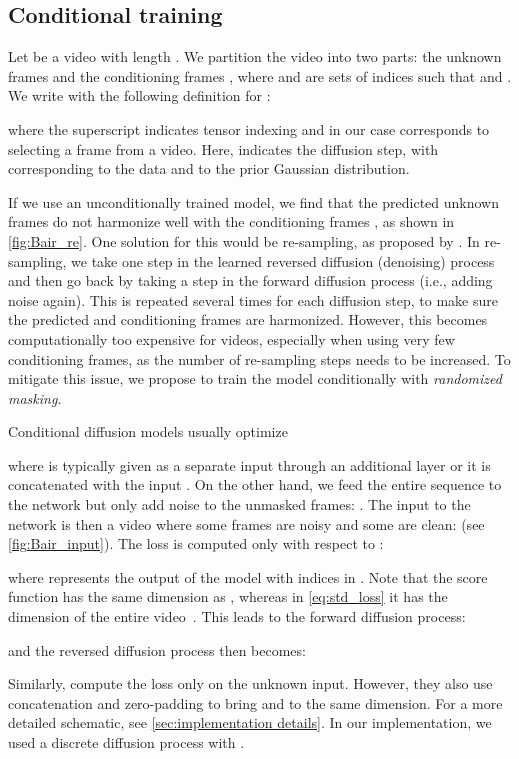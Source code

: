 \documentclass[10pt]{article} \usepackage[accepted]{tmlr}
\begin{document}
\subsection{Conditional training}
\label{sec:conditional_training}
Let  be a video with length . We partition the video  into two parts: the unknown frames  and the conditioning frames , where  and  are sets of indices such that  and . We write  with the following definition for :

where the superscript  indicates tensor indexing and in our case corresponds to selecting a frame from a video.
Here,  indicates the diffusion step, with  corresponding to the data and  to the prior Gaussian distribution.


If we use an unconditionally trained model, we find that the predicted unknown frames  do not harmonize well with the conditioning frames , as shown in \cref{fig:Bair_re}. One solution for this would be re-sampling, as proposed by \citet{Lugmayr_2022}. 
In re-sampling, we take one step in the learned reversed diffusion (denoising) process and then go back by taking a step in the forward diffusion process (i.e., adding noise again). This is repeated several times for each diffusion step, to make sure the predicted and conditioning frames are harmonized. However, this becomes computationally too expensive for videos, especially when using very few conditioning frames, as the number of re-sampling steps needs to be increased. To mitigate this issue, we propose to train the model conditionally with \emph{randomized masking}.

Conditional diffusion models usually optimize

where  is typically given as a separate input through an additional layer \citep{chen2021wavegrad} or it is concatenated with the input \citep{Saharia_2021, batzolis_2021, Saharia_2021_2}. On the other hand, we feed the entire sequence to the network  but only add noise to the unmasked frames: . The input to the network is then a video where some frames are noisy and some are clean:  (see \cref{fig:Bair_input}). The loss is computed only with respect to :

where  represents the output of the model with indices in . Note that the score function  has the same dimension as , whereas in \cref{eq:std_loss} it has the dimension of the entire video~. This leads to the forward diffusion process:

and the reversed diffusion process then becomes:

Similarly, \citet{tashiro2021csdi} compute the loss only on the unknown input. However, they also use concatenation and zero-padding to bring  and  to the same dimension. For a more detailed schematic, see \cref{sec:implementation details}. In our implementation, we used a discrete diffusion process with .
\end{document}
